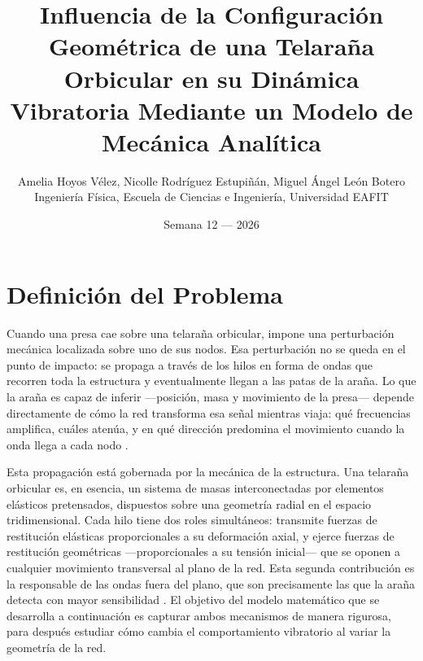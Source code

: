 \documentclass[11pt,letterpaper]{article}
\title{\textbf{\LARGE Influencia de la Configuración Geométrica
de una Telaraña Orbicular en su Dinámica Vibratoria
Mediante un Modelo de Mecánica Analítica}}
\author{Amelia Hoyos Vélez, Nicolle Rodríguez Estupiñán, Miguel Ángel León Botero\\[0.3cm]
\small Ingeniería Física, Escuela de Ciencias e Ingeniería, Universidad EAFIT}
\date{Semana 12 --- 2026}
\begin{document}
\maketitle

\section{Definición del Problema}
Cuando una presa cae sobre una telaraña orbicular, impone una perturbación mecánica localizada sobre uno de sus nodos. Esa perturbación no se queda en el punto de impacto: se propaga a través de los hilos en forma de ondas que recorren toda la estructura y eventualmente llegan a las patas de la
araña. Lo que la araña es capaz de inferir ---posición, masa y movimiento de la presa--- depende directamente de cómo la red transforma esa señal mientras viaja: qué frecuencias amplifica, cuáles atenúa, y en qué dirección predomina el movimiento cuando la onda llega a cada nodo
\cite{mortimer2016,masters1981,mortimer2019decoding}.

Esta propagación está gobernada por la mecánica de la estructura. Una telaraña orbicular es, en esencia, un sistema de masas interconectadas por elementos elásticos pretensados, dispuestos sobre una geometría radial en
el espacio tridimensional. Cada hilo tiene dos roles simultáneos: transmite fuerzas de restitución elásticas proporcionales a su deformación axial, y
ejerce fuerzas de restitución geométricas ---proporcionales a su tensión inicial--- que se oponen a cualquier movimiento transversal al plano de la red. Esta segunda contribución es la responsable de las ondas fuera del plano, que son precisamente las que la araña detecta con mayor sensibilidad \cite{mortimer2019,nakata2010,lott2022,soler2016}. El objetivo del modelo matemático que se desarrolla a continuación es capturar ambos mecanismos de manera rigurosa, para después estudiar cómo cambia el comportamiento vibratorio al variar la geometría de la red.
\end{document}
